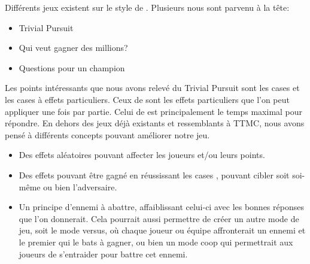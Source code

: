 Différents jeux existent sur le style de . Plusieurs nous sont parvenu à la tête:
\begin{itemize}
	\item Trivial Pursuit
	\item Qui veut gagner des millions?
	\item Questions pour un champion
\end{itemize}

Les points intéressants que nous avons relevé du Trivial Pursuit sont les cases  et les cases à effets particuliers.
Ceux de  sont les effets particuliers que l’on peut appliquer une fois par partie.
Celui de  est principalement le temps maximal pour répondre. 
\newline
En dehors des jeux déjà existants et ressemblants à TTMC, nous avons pensé à différents concepts pouvant améliorer notre jeu.
\begin{itemize}
	\item Des effets aléatoires pouvant affecter les joueurs et/ou leurs points.
	\item Des effets pouvant être gagné en réussissant les cases , pouvant cibler soit soi-même ou bien l’adversaire.
	\item Un principe d’ennemi à abattre, affaiblissant celui-ci avec les bonnes réponses que l’on donnerait.
        Cela pourrait aussi permettre de créer un autre mode de jeu, soit le mode versus, où chaque joueur ou équipe affronterait un ennemi et le premier qui le bats à gagner, ou bien un mode coop qui permettrait aux joueurs de s’entraider pour battre cet ennemi.
\end{itemize}
